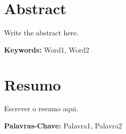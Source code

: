 \chapter*{Abstract}

Write the abstract here.

\bigskip

\textbf{Keywords:} Word1, Word2

\cleardoublepage
\chapter*{Resumo}
Escrever o resumo aqui.

\bigskip

\textbf{Palavras-Chave:} Palavra1, Palavra2
